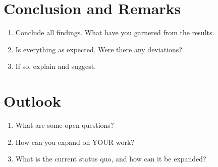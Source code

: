 \documentclass{article}
\begin{document}
\section{Conclusion and Remarks}
\begin{enumerate}
    \item Conclude all findings. What have you garnered from the results. 
    \item Is everything as expected. Were there any deviations?
    \item If so, explain and suggest. 
\end{enumerate}

\section{Outlook}
\begin{enumerate}
    \item What are some open questions?
    \item How can you expand on YOUR work?
    \item What is the current status quo, and how can it be expanded?
\end{enumerate}
\newpage
\end{document}
